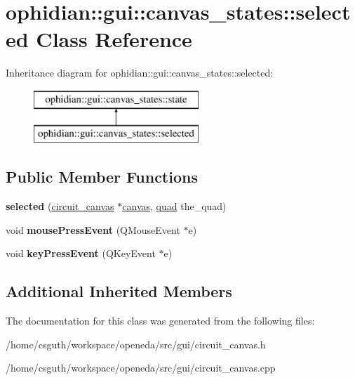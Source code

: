 \hypertarget{classophidian_1_1gui_1_1canvas__states_1_1selected}{\section{ophidian\-:\-:gui\-:\-:canvas\-\_\-states\-:\-:selected Class Reference}
\label{classophidian_1_1gui_1_1canvas__states_1_1selected}
}
Inheritance diagram for ophidian\-:\-:gui\-:\-:canvas\-\_\-states\-:\-:selected\-:\begin{figure}[H]
\begin{center}
\leavevmode
\includegraphics[height=2.000000cm]{classophidian_1_1gui_1_1canvas__states_1_1selected}
\end{center}
\end{figure}
\subsection*{Public Member Functions}
\begin{DoxyCompactItemize}
\item 
\hypertarget{classophidian_1_1gui_1_1canvas__states_1_1selected_a3cd4c646ad2da135e0fd00c57ede3f12}{{\bfseries selected} (\hyperlink{classophidian_1_1gui_1_1circuit__canvas}{circuit\-\_\-canvas} $\ast$\hyperlink{classophidian_1_1gui_1_1canvas}{canvas}, \hyperlink{structophidian_1_1gui_1_1quad}{quad} the\-\_\-quad)}\label{classophidian_1_1gui_1_1canvas__states_1_1selected_a3cd4c646ad2da135e0fd00c57ede3f12}

\item 
\hypertarget{classophidian_1_1gui_1_1canvas__states_1_1selected_a3e020561cdaf36b601d326dd474faa6a}{void {\bfseries mouse\-Press\-Event} (Q\-Mouse\-Event $\ast$e)}\label{classophidian_1_1gui_1_1canvas__states_1_1selected_a3e020561cdaf36b601d326dd474faa6a}

\item 
\hypertarget{classophidian_1_1gui_1_1canvas__states_1_1selected_a9ca8766efdffa2e8424762ea10868fca}{void {\bfseries key\-Press\-Event} (Q\-Key\-Event $\ast$e)}\label{classophidian_1_1gui_1_1canvas__states_1_1selected_a9ca8766efdffa2e8424762ea10868fca}

\end{DoxyCompactItemize}
\subsection*{Additional Inherited Members}


The documentation for this class was generated from the following files\-:\begin{DoxyCompactItemize}
\item 
/home/csguth/workspace/openeda/src/gui/circuit\-\_\-canvas.\-h\item 
/home/csguth/workspace/openeda/src/gui/circuit\-\_\-canvas.\-cpp\end{DoxyCompactItemize}
